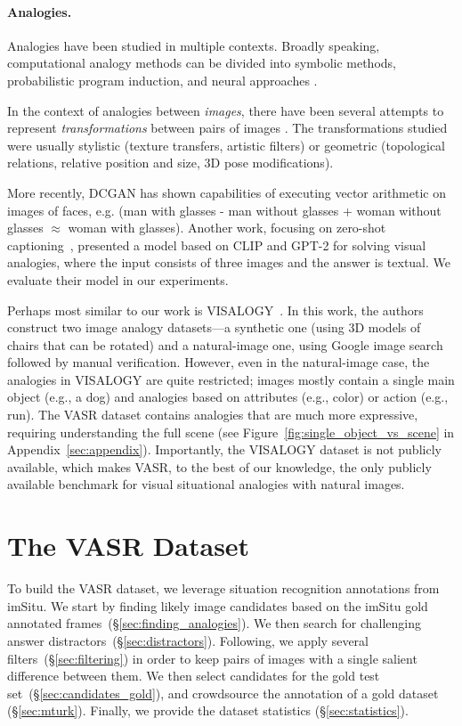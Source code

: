 \documentclass[letterpaper]{article} \usepackage{aaai23}  \usepackage{times}  \usepackage{helvet}  \usepackage{courier}  \usepackage[hyphens]{url}  \usepackage{graphicx} \urlstyle{rm} \def\UrlFont{\rm}  \usepackage{natbib}  \usepackage{caption} \frenchspacing  \setlength{\pdfpagewidth}{8.5in}  \setlength{\pdfpageheight}{11in}  \usepackage{algorithm}
\begin{document}
\paragraph{Analogies.} 
Analogies have been studied in multiple contexts. Broadly speaking, computational analogy methods can be divided into symbolic methods, probabilistic program induction, and neural approaches \cite{mitchell2021abstraction}. 


In the context of analogies between \emph{images}, there have been several attempts to represent \emph{transformations} between pairs of images \cite{memisevic2010learning,reed2015deep,hertzmann2001image,forbus2011cogsketch}. The transformations studied were usually stylistic (texture transfers, artistic filters) or geometric (topological relations, relative position and size, 3D pose modifications). 

More recently, DCGAN \cite{radford2015unsupervised} has shown capabilities of executing vector arithmetic on images of faces, e.g. (man with glasses - man without glasses + woman without glasses $\approx$ woman with glasses). Another work, focusing on zero-shot captioning~\cite{tewel2021zero}, presented a model based on CLIP and GPT-2 \cite{radford2019language} for solving visual analogies, where the input consists of three images and the answer is textual. We evaluate their model in our experiments. 

Perhaps most similar to our work is VISALOGY~\cite{sadeghi2015visalogy}. In this work, the authors construct two image analogy datasets---a synthetic one (using 3D models of chairs that can be rotated) and a natural-image one, using Google image search followed by manual verification. However, even in the natural-image case, the analogies in VISALOGY are quite restricted; images mostly contain a single main object (e.g., a dog) and analogies based on attributes (e.g., color) or action (e.g., run). The VASR dataset contains analogies that are much more expressive, requiring understanding the full scene (see Figure~\ref{fig:single_object_vs_scene} in Appendix~\ref{sec:appendix}).
Importantly, the VISALOGY dataset is not publicly available, which makes VASR, to the best of our knowledge, the only publicly available benchmark for visual situational analogies with natural images.

\section{The VASR Dataset}
To build the VASR dataset, we leverage situation recognition annotations from imSitu. We start by finding likely image candidates based on the imSitu gold annotated frames~(\S\ref{sec:finding_analogies}). We then search for challenging answer distractors~(\S\ref{sec:distractors}). Following, we apply several filters~(\S\ref{sec:filtering}) in order to keep pairs of images with a single salient difference between them. We then select candidates for the gold test set~(\S\ref{sec:candidates_gold}), and crowdsource the annotation of a gold dataset (\S\ref{sec:mturk}). Finally, we provide the dataset statistics (\S\ref{sec:statistics}).
\end{document}
